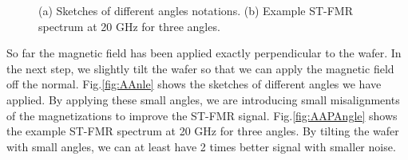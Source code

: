 \begin{figure}[!ht]
\centering
{}
\caption{(a) Sketches of different angles notations. (b) Example ST-FMR spectrum at 20 GHz for three angles.}
\end{figure}

So far the magnetic field has been applied exactly perpendicular to the wafer. In the next step, we slightly tilt the wafer so that we can apply the magnetic field off the normal. Fig.\ref{fig:AAnle} shows the sketches of different angles we have applied. By applying these small angles, we are introducing small misalignments of the magnetizations to improve the ST-FMR signal. Fig.\ref{fig:AAPAngle} shows the example ST-FMR spectrum at 20 GHz for three angles. By tilting the wafer with small angles, we can at least have 2 times better signal with smaller noise.

